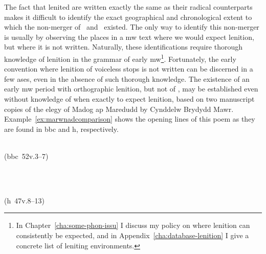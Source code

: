 The fact that lenited  are written exactly the same as their radical counterparts makes it difficult to identify the exact geographical and chronological extent to which the non-merger of \xD\ and \lT\ existed. The only way to identify this non-merger is usually by observing the places in a \gls{mw} text where we would expect lenition, but where it is not written. Naturally, these identifications require thorough knowledge of lenition in  the grammar of early \gls{mw}\footnote{In Chapter~\ref{cha:some-phon-issu} I discuss my policy on where lenition can consistently be expected, and in Appendix~\ref{cha:database-lenition} I give a concrete list of leniting environments.}. Fortunately, the early convention where lenition of voiceless stops is not written can be discerned in a few ases, even in the absence of such thorough knowledge. The existence of an early \gls{mw} period with orthographic lenition, but  not of \lT, may be established even without knowledge of when exactly to expect lenition, based on two manuscript copies of the elegy of Madog ap Maredudd  by Cynddelw Brydydd Mawr. Example~\ref{ex:marwnadcomparison} shows the opening lines of this poem as they are found in \gls{bbc}  and \gls{h}, respectively.
\begin{mwl}
\item%
  \begin{minipage}[t]{0.45\textwidth}
    \\
    (\acrshort{bbc}~52v.3--7)
  \end{minipage}~
  \begin{minipage}[t]{0.45\textwidth}
    \\
    (\acrshort{h}~47v.8--13)
  \end{minipage}
  \label{ex:marwnadcomparison}
\end{mwl}
